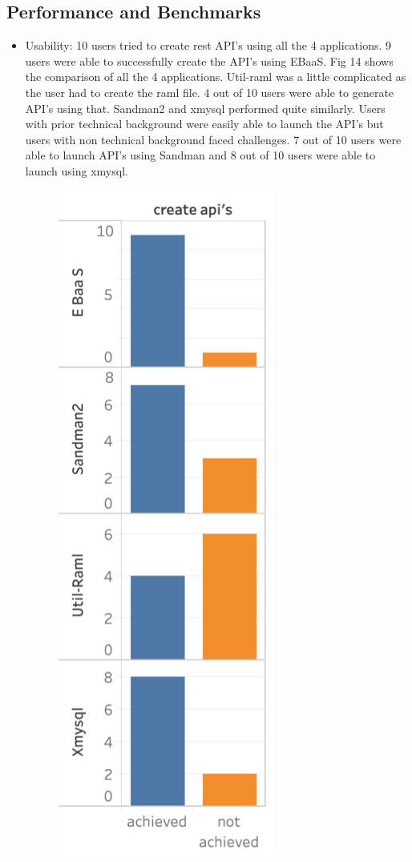 \documentclass[letterpaper, 10 pt, conference]{ieeeconf}
\begin{document}
\subsection{Performance and Benchmarks}
\begin{itemize}
    \item Usability: 10 users tried to create rest API's using all the 4 applications. 9 users were able to successfully create the API's using EBaaS. Fig 14 shows the comparison of all the 4 applications. Util-raml was a little complicated as the user had to create the raml file. 4 out of 10 users were able to generate API's using that. Sandman2 and xmysql performed quite similarly. Users with prior technical background were easily able to launch the API's but users with non technical background faced challenges. 7 out of 10 users were able to launch API's using Sandman and  8 out of 10 users were able to launch using xmysql.
    \begin{figure}[h]
   \centering
   \includegraphics[scale=0.33]{./CreateApis.png}

\end{figure}
\end{itemize}
\end{document}
